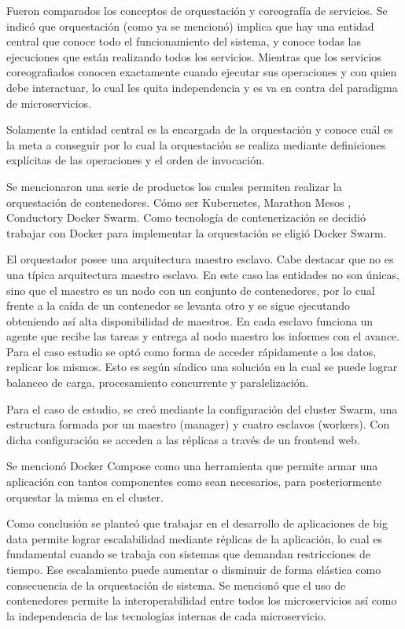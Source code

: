 Fueron comparados los conceptos de orquestación y coreografía de servicios. Se indicó que orquestación (como ya se mencionó) implica que hay una entidad central que conoce todo el funcionamiento del sistema, y conoce todas las ejecuciones que están realizando todos los servicios. 
Mientras que los servicios coreografiados conocen exactamente cuando ejecutar sus operaciones y con quien debe interactuar, lo cual les quita independencia y es va en contra del paradigma de microservicios.


Solamente la entidad central es la encargada de la orquestación y conoce cuál es la meta a conseguir por lo cual la orquestación se realiza mediante definiciones explícitas de las operaciones y el orden de invocación.

Se mencionaron una serie de productos los cuales permiten realizar la orquestación de contenedores.
Cómo ser Kubernetes, Marathon Mesos \cite{matathonMesos}, Conductor\cite{conductor}y Docker Swarm\cite{dockerSwarm}. 
Como tecnología de contenerización se decidió trabajar con Docker para implementar la orquestación se eligió  Docker Swarm. 
 
 
El orquestador posee una arquitectura maestro esclavo. Cabe destacar que no es una típica arquitectura maestro esclavo. En este caso las entidades no son únicas, sino que el maestro es un nodo con un conjunto de contenedores, por lo cual frente a la caída de un contenedor se levanta otro y se sigue ejecutando obteniendo así alta disponibilidad de maestros.
En cada esclavo funciona un agente que recibe las tareas y entrega al nodo maestro los informes con el avance. 
Para el caso estudio se optó como forma de acceder rápidamente a los datos, replicar los mismos. 
Esto es según síndico una solución en la cual se puede lograr balanceo de carga, procesamiento concurrente y paralelización. 


Para el caso de estudio, se creó mediante la configuración del cluster Swarm, una estructura formada por un maestro (manager) y cuatro esclavos (workers). 
Con dicha configuración se acceden a las réplicas a través de un frontend web.

Se mencionó Docker Compose\cite{dockerCompose} como una herramienta que permite armar una aplicación con tantos componentes como sean necesarios, para posteriormente orquestar la misma en el cluster. 


Como conclusión se planteó que trabajar en el desarrollo de aplicaciones de big data permite lograr escalabilidad mediante réplicas de la aplicación, lo cual es fundamental cuando se trabaja con sistemas que demandan restricciones de tiempo. 
Ese escalamiento puede aumentar o disminuir de forma elástica como consecuencia de la orquestación de sistema. 
Se mencionó que el uso de contenedores permite la interoperabilidad entre todos los microservicios así como la independencia de las tecnologías internas de cada microservicio.

